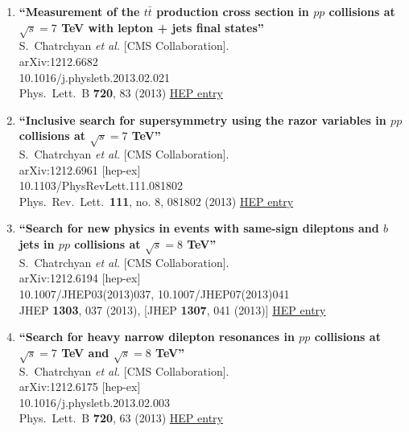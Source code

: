 \documentclass{article}
\begin{document}
\begin{enumerate}
\item%
{\bf ``Measurement of the $t\bar{t}$ production cross section in $pp$ collisions at $\sqrt{s}=7$ TeV with lepton + jets final states''}
  \\{}S.~Chatrchyan {\it et al.} [CMS Collaboration].
  \\{}arXiv:1212.6682
    \\{}10.1016/j.physletb.2013.02.021
\\{}Phys.\ Lett.\ B {\bf 720}, 83 (2013) %
\href{http://inspirehep.net/record/1208913}{HEP entry}


\item%
{\bf ``Inclusive search for supersymmetry using the razor variables in $pp$ collisions at $\sqrt{s}=7$ TeV''}
  \\{}S.~Chatrchyan {\it et al.} [CMS Collaboration].
  \\{}arXiv:1212.6961 [hep-ex]
    \\{}10.1103/PhysRevLett.111.081802
\\{}Phys.\ Rev.\ Lett.\  {\bf 111}, no. 8, 081802 (2013) %
\href{http://inspirehep.net/record/1208812}{HEP entry}


\item%
{\bf ``Search for new physics in events with same-sign dileptons and $b$ jets in $pp$ collisions at $\sqrt{s}=8$ TeV''}
  \\{}S.~Chatrchyan {\it et al.} [CMS Collaboration].
  \\{}arXiv:1212.6194 [hep-ex]
    \\{}10.1007/JHEP03(2013)037, 10.1007/JHEP07(2013)041
\\{}JHEP {\bf 1303}, 037 (2013), [JHEP {\bf 1307}, 041 (2013)] %
\href{http://inspirehep.net/record/1208703}{HEP entry}


\item%
{\bf ``Search for heavy narrow dilepton resonances in $pp$ collisions at $\sqrt{s}=7$ TeV and $\sqrt{s}=8$ TeV''}
  \\{}S.~Chatrchyan {\it et al.} [CMS Collaboration].
  \\{}arXiv:1212.6175 [hep-ex]
    \\{}10.1016/j.physletb.2013.02.003
\\{}Phys.\ Lett.\ B {\bf 720}, 63 (2013) %
\href{http://inspirehep.net/record/1208702}{HEP entry}



\end{enumerate}
\end{document}
